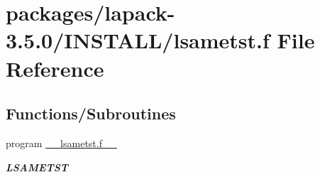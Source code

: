 \hypertarget{lsametst_8f}{}\section{packages/lapack-\/3.5.0/\+I\+N\+S\+T\+A\+L\+L/lsametst.f File Reference}
\label{lsametst_8f}
\subsection*{Functions/\+Subroutines}
\begin{DoxyCompactItemize}
\item 
program \hyperlink{group__auxOTHERauxiliary_gac14a642d1c4ae2713896577ae288bb58}{\+\_\+\+\_\+lsametst.\+f\+\_\+\+\_\+}
\begin{DoxyCompactList}\small\item\em {\bfseries L\+S\+A\+M\+E\+T\+S\+T} \end{DoxyCompactList}\end{DoxyCompactItemize}
